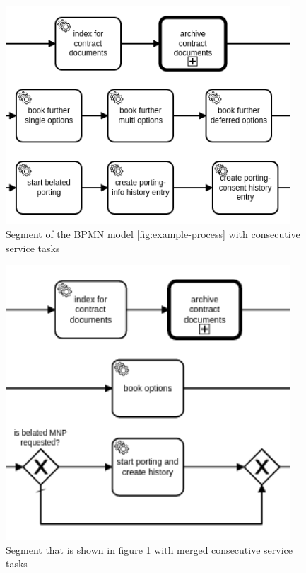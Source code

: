 \begin{minipage}[t]{0.5\textwidth}
	\begin{figure}[H]
		\centering
		\includegraphics[width=0.95\textwidth]{graphics/case-study-merge-org-2}
		\caption{Segment of the BPMN model \ref{fig:example-process} with consecutive service tasks}
		\label{fig:merge-2-org}
	\end{figure}
\end{minipage}
\begin{minipage}[t]{0.5\textwidth}
	\begin{figure}[H]
		\centering
		\includegraphics[width=0.95\textwidth]{graphics/case-study-merge-new-2}
		\caption{Segment that is shown in figure \ref{fig:merge-2-org} with merged consecutive service tasks}
		\label{fig:merge-2-new}
	\end{figure}
\end{minipage}

